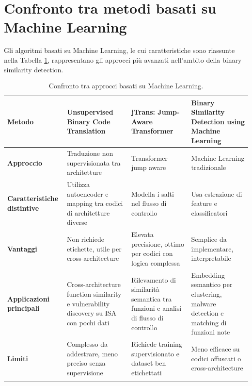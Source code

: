 \documentclass[12pt,a4paper,openright,twoside]{report}
\begin{document}
\section{Confronto tra metodi basati su Machine Learning}

Gli algoritmi basati su Machine Learning, le cui caratteristiche sono riassunte nella Tabella \ref{confrontoML}, rappresentano gli approcci più avanzati nell'ambito della binary similarity detection.

\renewcommand{\arraystretch}{1.3}
\begin{longtable}{|p{3cm}|p{3.5cm}|p{3.5cm}|p{3cm}|}
\hline
\endfirsthead
\textbf{Metodo} & \textbf{Unsupervised Binary Code Translation \cite{UnsuperBinTrans}} & \textbf{jTrans: Jump-Aware Transformer \cite{jTrans}} & \textbf{Binary Similarity Detection using Machine Learning \cite{Zeek}} \\
\hline
\textbf{Approccio} & Traduzione non supervisionata tra architetture & Transformer jump aware & Machine Learning tradizionale\\
\hline
\textbf{Caratteristiche distintive} & Utilizza autoencoder e mapping tra codici di architetture diverse & Modella i salti nel flusso di controllo & Usa estrazione di feature e classificatori\\ 
\hline
\textbf{Vantaggi} & Non richiede etichette, utile per cross-architecture & Elevata precisione, ottimo per codici con logica complessa & Semplice da implementare, interpretabile\\ 
\hline
\textbf{Applicazioni principali} & Cross-architecture function similarity e vulnerability discovery su ISA con pochi dati & Rilevamento di similarità semantica tra funzioni e analisi di flusso di controllo & Embedding semantico per clustering, malware detection e matching di funzioni note\\ 
\hline
\textbf{Limiti} & Complesso da addestrare, meno preciso senza supervisione & Richiede training supervisionato e dataset ben etichettati & Meno efficace su codici offuscati o cross-architecture\\ 
\hline
\caption{Confronto tra approcci basati su Machine Learning.}
\label{confrontoML}
\end{longtable}
\end{document}
